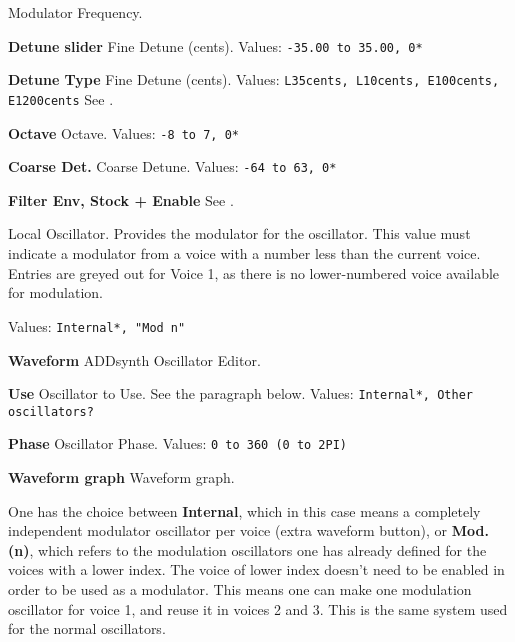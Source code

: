    Modulator Frequency.

   \begin{enumber}
      \item \textbf{Detune slider}
         Fine Detune (cents).
         Values: \texttt{-35.00 to 35.00, 0*}
      \item \textbf{Detune Type}
         Fine Detune (cents).
         Values: \texttt{L35cents, L10cents, E100cents, E1200cents}
         See .
      \item \textbf{Octave}
         Octave.
         Values: \texttt{-8 to 7, 0*}
      \item \textbf{Coarse Det.}
         Coarse Detune.
         Values: \texttt{-64 to 63, 0*}
      \item \textbf{Filter Env, Stock + Enable}
         See .
   \end{enumber}

   Local Oscillator.
   Provides the modulator for the oscillator.
   This value must indicate a modulator from a voice with a number less than
   the current voice. Entries are greyed out for Voice 1, as there is no
   lower-numbered voice available for modulation.

   Values: \texttt{Internal*, "Mod n"}

   \begin{enumber}
      \item \textbf{Waveform}
         ADDsynth Oscillator Editor.
      \item \textbf{Use}
         Oscillator to Use.
         See the paragraph below.
         Values: \texttt{Internal*, Other oscillators?}
      \item \textbf{Phase}
         Oscillator Phase.
         Values: \texttt{0 to 360 (0 to 2PI)}
      \item \textbf{Waveform graph}
         Waveform graph.
   \end{enumber}

   One has the choice between \textbf{Internal}, which in this case means a
   completely independent modulator oscillator per voice (extra waveform button),
   or \textbf{Mod. (n)}, which refers to the modulation oscillators one has
   already defined for the voices with a lower index.
   The voice of lower index doesn't need to be enabled in order to be used as a
   modulator. This means one can make one modulation oscillator for voice 1, and
   reuse it in voices 2 and 3.  This is the same system used for the normal
   oscillators.

